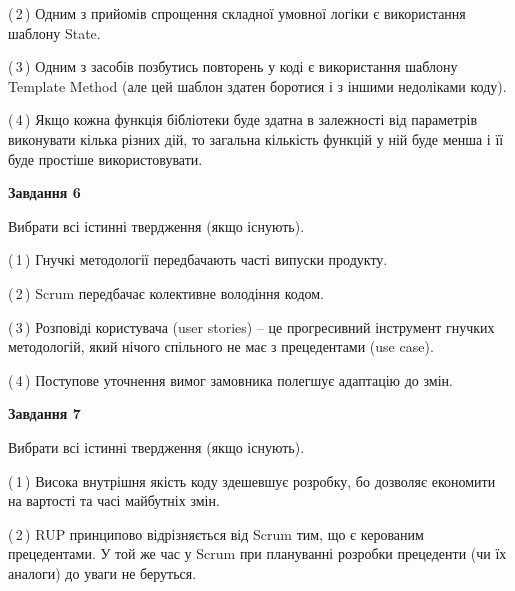 \documentclass[10pt, ukrainian]{article}
\begin{document}
{\begin {large}
(\,2\,) Одним з прийомів спрощення складної умовної логіки є використання шаблону State. %



(\,3\,) Одним з засобів позбутись повторень у коді є використання шаблону Template Method (але цей шаблон здатен боротися і з іншими недоліками коду). %



(\,4\,) Якщо кожна функція бібліотеки буде здатна в залежності від параметрів виконувати кілька різних дій, то загальна кількість функцій у ній буде менша і її буде простіше використовувати. %

\newpage

{\begin {center}\textbf{Завдання 6}\end {center}}\par
Вибрати всі істинні твердження (якщо існують).\par
\vspace{2mm}



(\,1\,) Гнучкі методології передбачають часті випуски продукту. %



(\,2\,) Scrum передбачає колективне володіння кодом. %



(\,3\,) Розповіді користувача (user stories) – це прогресивний інструмент гнучких методологій, який нічого спільного не має з прецедентами (use case). %



(\,4\,) Поступове уточнення вимог замовника полегшує адаптацію до змін. %


{\begin {center}\textbf{Завдання 7}\end {center}}\par
Вибрати всі істинні твердження (якщо існують).\par
\vspace{2mm}



(\,1\,) Висока внутрішня якість коду здешевшує розробку, бо дозволяє економити на вартості та часі майбутніх змін. %



(\,2\,) RUP принципово відрізняється від Scrum тим, що є керованим прецедентами. У той же час у Scrum при плануванні розробки прецеденти (чи їх аналоги) до уваги не беруться. %




\end{large}}
\end{document}
